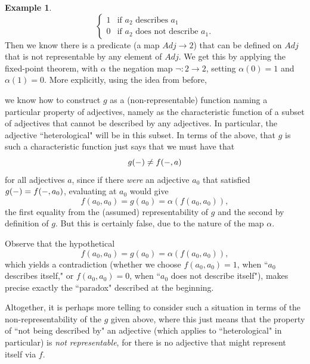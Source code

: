 \documentclass[a4paper]{book}
\theoremstyle{definition}
\newtheorem{example}{Example}[section]
\theoremstyle{definition}
\theoremstyle{definition}
\theoremstyle{theorem}
\theoremstyle{definition}
\begin{document}
\begin{example}
\begin{equation*}
\begin{cases}
1 & \text{if }  a_2 \text{ describes } a_1 \\
0 & \text{if  } a_2 \text{ does not describe } a_1. 
\end{cases}
\end{equation*}
Then we know there is a predicate (a map $Adj \rightarrow 2$) that can be defined on $Adj$ that is not representable by any element of $Adj$. We get this by applying the fixed-point theorem, with $\alpha$ the negation map $\neg: 2 \rightarrow 2$, setting $\alpha(0) = 1$ and $\alpha(1) = 0$. More explicitly, using the idea from before, 
\begin{center}
\end{center} 
we know how to construct $g$ as a (non-representable) function naming a particular property of adjectives, namely as the characteristic function of a subset of adjectives that cannot be described by any adjectives. In particular, the adjective ``heterological" will be in this subset. In terms of the above, that $g$ is such a characteristic function just says that we must have that 
\begin{equation*}
g(\--) \neq f(\--, a)
\end{equation*} 
for all adjectives $a$, since if there \textit{were} an adjective $a_0$ that satisfied $g(\--) = f(\--, a_0)$, evaluating at $a_0$ would give 
\begin{equation*}
f(a_0, a_0) = g(a_0) = \alpha(f(a_0, a_0)),
\end{equation*} 
the first equality from the (assumed) representability of $g$ and the second by definition of $g$. But this is certainly false, due to the nature of the map $\alpha$. \par 
Observe that the hypothetical 
\begin{equation*}
f(a_0, a_0) = g(a_0) = \alpha(f(a_0, a_0)),
\end{equation*}
which yields a contradiction (whether we choose $f(a_0, a_0) = 1$, when ``$a_0$ describes itself," or $f(a_0, a_0) = 0$, when ``$a_0$ does not describe itself"), makes precise exactly the ``paradox" described at the beginning. \par 
Altogether, it is perhaps more telling to consider such a situation in terms of the non-representability of the $g$ given above, where this just means that the property of ``not being described by" an adjective (which applies to ``heterological" in particular) is \textit{not representable}, for there is no adjective that might represent itself via $f$.  
\end{example} 
\end{document}
